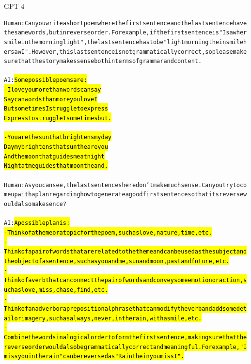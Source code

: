 \begin{AIbox}{GPT-4}
\scriptsize
\parbox{1\textwidth}{
\begin{alltt}
Human: Can you write a short poem where the first sentence and the last sentence have the same words, but in reverse order. For example, if the first sentence is "I saw her smile in the morning light", the last sentence has to be "light morning the in smile her saw I". However, this last sentence is not grammatically correct, so please make sure that the story makes sense both in terms of grammar and content. \\ \\
AI: \hl{Some possible poems are: \\
- I love you more than words can say \\
Say can words than more you love I\\ But sometimes I struggle to express\\ Express to struggle I sometimes but.\\ \\
- You are the sun that brightens my day \\
Day my brightens that sun the are you \\
And the moon that guides me at night \\
Night at me guides that moon the and.} \\ \\
Human: As you can see, the last sentences here don't make much sense. Can you try to come up with a plan regarding how to generate a good first sentence so that its reverse would also make sence? \\ \\
AI: \hl{A possible plan is: \\
- Think of a theme or a topic for the poem, such as love, nature, time, etc. \\
- Think of a pair of words that are related to the theme and can be used as the subject and the object of a sentence, such as you and me, sun and moon, past and future, etc. \\
- Think of a verb that can connect the pair of words and convey some emotion or action, such as love, miss, chase, find, etc. \\
- Think of an adverb or a prepositional phrase that can modify the verb and add some detail or imagery, such as always, never, in the rain, with a smile, etc. \\
- Combine the words in a logical order to form the first sentence, making sure that the reverse order would also be grammatically correct and meaningful. For example, "I miss you in the rain" can be reversed as "Rain the in you miss I".} \\ \\

\end{alltt}}
\end{AIbox}
